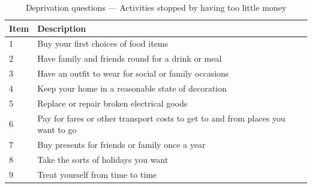 \begin{itemize}[wide=0pt, leftmargin=*, labelwidth=0pt, labelindent=\parindent, itemindent=0pt]
    \begin{table}[h!]
        \centering
        \caption{Deprivation questions --- Activities stopped by having too little money}
        \label{tab:deprivation}
        \begin{tabularx}{\textwidth}{lX}
            \toprule 
            Item & Description \\
            \midrule
            1 & Buy your first choices of food items \\
            2 & Have family and friends round for a drink or meal \\
            3 & Have an outfit to wear for social or family occasions \\
            4 & Keep your home in a reasonable state of decoration \\
            5 & Replace or repair broken electrical goods \\
            6 & Pay for fares or other transport costs to get to and from places you want to go \\
            7 & Buy presents for friends or family once a year \\
            8 & Take the sorts of holidays you want \\
            9 & Treat yourself from time to time \\
            \bottomrule
        \end{tabularx}
    \end{table}


\end{itemize}
